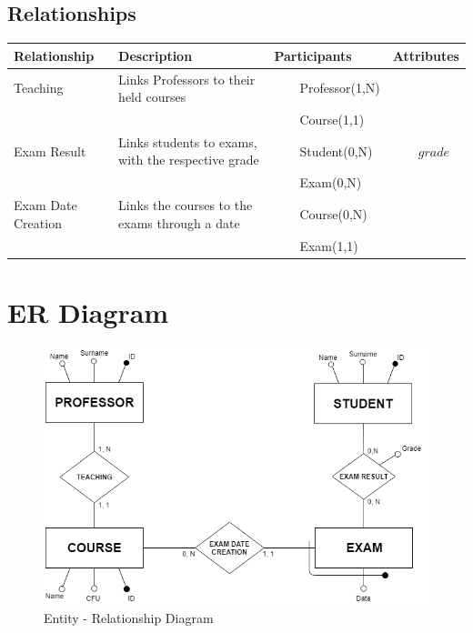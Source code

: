 \documentclass{report}
\newcommand{\tabitem}{~~\llap{\textbullet}~~}
\begin{document}
\newpage

\subsection*{Relationships}
\begin{table}[h]
	\centering
	\begin{tabular}{| m{6em} | m{14em} | m{8em} | m{7em} |}
		\hline
		\textbf{Relationship} & \textbf{Description} & \textbf{Participants} & \textbf{Attributes} \\
		\hline
		Teaching & Links Professors to their held courses & 
		\tabitem Professor(1,N) & \\ & &
		\tabitem Course(1,1) & \\
		\hline
		Exam Result & Links students to exams, with the respective grade & 
		\tabitem Student(0,N) & \tabitem $grade$ \\ & &
		\tabitem Exam(0,N) & \\
		\hline
		Exam Date Creation & Links the courses to the exams through a date & 
		\tabitem Course(0,N) & \\ & & 
		\tabitem Exam(1,1) & \\
		\hline
	\end{tabular}
\end{table}
\vspace{5em}
\section*{ER Diagram}
\vspace{2em}
\begin{figure}[ht]
	\includegraphics[width=1\textwidth]{ER_Diagram.png}
	\caption{Entity - Relationship Diagram}
\end{figure}
\end{document}

